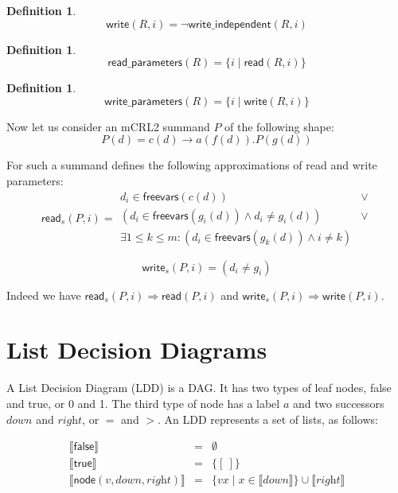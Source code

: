 \documentclass{article}
\newtheorem{definition}[theorem]{Definition}
\newcommand{\var}[1]{\ensuremath{\textit{#1}}}
\newcommand{\emptylist}{\ensuremath{[\:]}}
\begin{document}
\begin{definition}
\[
\textsf{write}(R, i) = \neg \textsf{write\_independent}(R, i)
\]
\end{definition}

\begin{definition}
\[
\textsf{read\_parameters}(R) = \{ i \mid \textsf{read}(R, i) \}
\]
\end{definition}

\begin{definition}
\[
\textsf{write\_parameters}(R) = \{ i \mid \textsf{write}(R, i) \}
\]
\end{definition}

\vspace{0.5cm}
\noindent
Now let us consider an mCRL2 summand $P$ of the following shape:
\[
P(d) = c(d) \rightarrow a(f(d)) . P(g(d))
\]

\noindent
For such a summand \cite{DBLP:conf/hvc/MeijerKBP14} defines the following approximations of read and write parameters:
\[
\textsf{read}_s(P, i) =
\begin{array}{ll}
d_i \in \textsf{freevars}(c(d)) & \lor \\
(d_i \in \textsf{freevars}(g_i(d)) \land d_i \neq g_i(d)) & \lor \\   
\exists 1 \leq k \leq m: (d_i \in \textsf{freevars}(g_k(d)) \land i \neq k)   
\end{array}
\]

\[
\textsf{write}_s(P, i) = (d_i \neq g_i)
\]

\vspace{0.5cm}
\noindent
Indeed we have $\textsf{read}_s(P, i) \Rightarrow \textsf{read}(P, i)$ and
$\textsf{write}_s(P, i) \Rightarrow \textsf{write}(P, i)$.

\newpage
\section{List Decision Diagrams}

A List Decision Diagram (LDD) is a DAG. It has two types of leaf nodes, \textsf{false} and \textsf{true}, or 0 and 1. The third type of node has a label $a$ and two successors \var{down} and \var{right}, or $=$ and $>$.
An LDD represents a set of lists, as follows:

\begin{equation*}
\begin{array}{lll}
  \llbracket \textsf{false} \rrbracket & = & \emptyset \\
  \llbracket \textsf{true} \rrbracket & = & \{ \emptylist \} \\
  \llbracket \textsf{node}(v, \var{down}, \var{right}) \rrbracket & = & 
    \{ vx \mid x \in \llbracket \var{down} \rrbracket \} \cup \llbracket \var{right} \rrbracket
\end{array}
\end{equation*}
\end{document}
